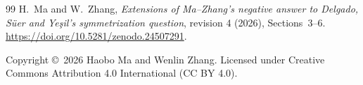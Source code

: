 \documentclass[11pt,a4paper]{article}
\theoremstyle{definition}
\theoremstyle{remark}
\begin{document}
\begin{thebibliography}{99}
 H.~Ma and W.~Zhang, \emph{Extensions of Ma--Zhang's negative answer
to Delgado, S\"uer and Ye\c{s}il's symmetrization question}, revision 4 (2026),
Sections~3--6. \url{https://doi.org/10.5281/zenodo.24507291}.
\end{thebibliography}

\smallskip
\noindent\small Copyright \copyright\ 2026 Haobo Ma and Wenlin Zhang.
Licensed under Creative Commons Attribution 4.0 International (CC BY 4.0).
\end{document}
